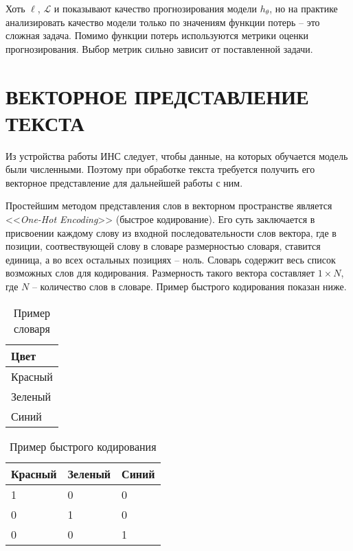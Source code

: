 Хоть $\ell$, $\mathcal{L}$ и показывают качество прогнозирования модели $h_{\theta}$, но на практике анализировать качество модели только по значениям функции потерь -- это сложная задача. Помимо функции потерь используются метрики оценки прогнозирования. Выбор метрик сильно зависит от поставленной задачи.

\section{ВЕКТОРНОЕ ПРЕДСТАВЛЕНИЕ ТЕКСТА}
Из устройства работы ИНС следует, чтобы данные, на которых обучается модель были численными. Поэтому при обработке текста требуется получить его векторное представление для дальнейшей работы с ним.

Простейшим методом представления слов в векторном пространстве является <<\textit{One-Hot Encoding}>> (быстрое кодирование). Его суть заключается в присвоении каждому слову из входной последовательности слов вектора, где в позиции, соотвествующей слову в словаре размерностью словаря, ставится единица, а во всех остальных позициях -- ноль. Словарь содержит весь список возможных слов для кодирования. Размерность такого вектора составляет $1 \times N$, где $N$ -- количество слов в словаре. Пример быстрого кодирования показан ниже.

\begin{table}[H]
    \captionsetup{format=hang, singlelinecheck=false}
    \raggedleft
    \caption{Пример словаря}
    \label{tab:dict}
    \centering
    \begin{tabular}{|p{5cm}|}
        \hline
        \textbf{Цвет} \\
        \hline
        Красный       \\
        \hline
        Зеленый       \\
        \hline
        Синий         \\
        \hline
    \end{tabular}
\end{table}

\begin{table}[H]
    \captionsetup{format=hang, singlelinecheck=false}
    \raggedleft
    \caption{Пример быстрого кодирования}
    \label{tab:ohe}
    \centering
    \begin{tabular}{|p{5cm}|p{5cm}|p{5cm}|}
        \hline
        \textbf{Красный} & \textbf{Зеленый} & \textbf{Синий} \\
        \hline
        1                & 0                & 0              \\
        \hline
        0                & 1                & 0              \\
        \hline
        0                & 0                & 1              \\
        \hline
    \end{tabular}
\end{table}

